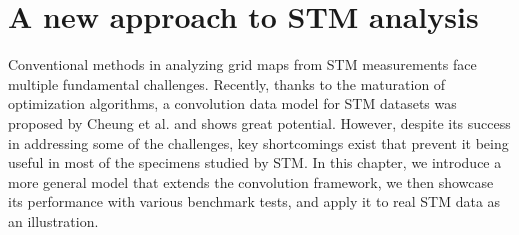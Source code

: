 \chapter{A new approach to STM analysis}
Conventional methods in analyzing grid maps from STM measurements face multiple fundamental  challenges. Recently, thanks to the maturation of optimization algorithms, a convolution data model for STM datasets was proposed by Cheung et al.\cite{cheungDictionaryLearningFouriertransform2020} and shows great potential. However,  despite its success in addressing some of the challenges, key shortcomings exist that prevent it being useful in most of the specimens studied by STM. In this chapter, we introduce a more general model that extends the convolution framework, we then showcase its performance with various benchmark tests, and apply it to real STM data as an illustration.  












